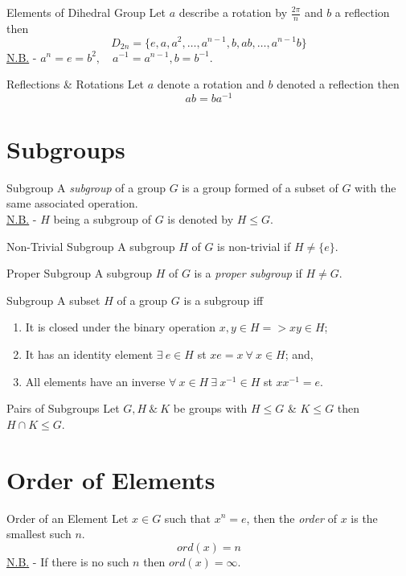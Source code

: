 \documentclass[11pt,a4paper]{article}
\begin{document}
\subtitle{Proposition 4.03 - }{Elements of Dihedral Group}
Let $a$ describe a rotation by $\frac{2\pi}{n}$ and $b$ a reflection then
$$D_{2n} = \{ e, a, a^2, \dots, a^{n-1}, b, ab , \dots , a^{n-1}b\}$$
\underline{N.B.} - $a^n = e = b^2,\quad a^{-1} = a^{n-1}, b = b^{-1}$.\\

\subtitle{Proposition 4.04 - }{Reflections \& Rotations}
Let $a$ denote a rotation and $b$ denoted a reflection then $$ab = ba^{-1}$$

\section{Subgroups}

\subtitle{Definition 5.01 - }{Subgroup}
A \textit{subgroup} of a group $G$ is a group formed of a subset of $G$ with the same associated operation.\\
\underline{N.B.} - $H$ being a subgroup of $G$ is denoted by $H \leq G$.\\

\subtitle{Definition 5.02 - }{Non-Trivial Subgroup}
A subgroup $H$ of $G$ is non-trivial if $H \not = \{ e \}$.\\

\subtitle{Definition 5.03 - }{Proper Subgroup}
A subgroup $H$ of $G$ is a \textit{proper subgroup} if $H \not = G$.\\

\subtitle{Theorem 5.04 - }{Subgroup}
A subset $H$ of a group $G$ is a subgroup iff
\begin{enumerate}[label=\roman*)]
  \item It is closed under the binary operation $x, y \in H => xy \in H$;
  \item It has an identity element $\exists\ e \in H$ st $xe = x\ \forall\ x \in H$; and,
  \item All elements have an inverse $\forall\ x \in H\ \exists\ x^{-1} \in H$ st $xx^{-1} = e$.\\
\end{enumerate}

\subtitle{Proposition 5.05 - }{Pairs of Subgroups}
Let $G, H\ \&\ K$ be groups with $H \leq G$ \& $K \leq G$ then $H \cap K \leq G$.

\section{Order of Elements}

\subtitle{Definition 6.01 - }{Order of an Element}
Let $x \in G$ such that $x^n = e$, then the \textit{order} of $x$ is the smallest such $n$.$$ord(x) = n$$
\underline{N.B.} - If there is no such $n$ then $ord(x) = \infty$.\\
\end{document}
